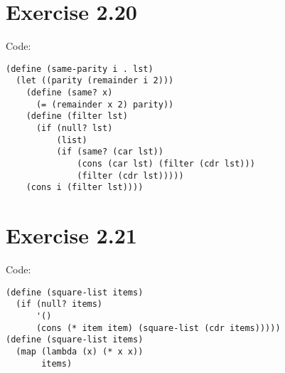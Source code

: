 \documentclass[../main.tex]{subfiles}
\begin{document}
\section{Exercise 2.20}

Code:

\begin{lstlisting}
(define (same-parity i . lst)
  (let ((parity (remainder i 2)))
    (define (same? x)
      (= (remainder x 2) parity))
    (define (filter lst)
      (if (null? lst)
          (list)
          (if (same? (car lst))
              (cons (car lst) (filter (cdr lst)))
              (filter (cdr lst)))))
    (cons i (filter lst))))
\end{lstlisting}

\section{Exercise 2.21}

Code:

\begin{lstlisting}
(define (square-list items)
  (if (null? items)
      '()
      (cons (* item item) (square-list (cdr items)))))
(define (square-list items)
  (map (lambda (x) (* x x))
       items)
\end{lstlisting}
\end{document}

